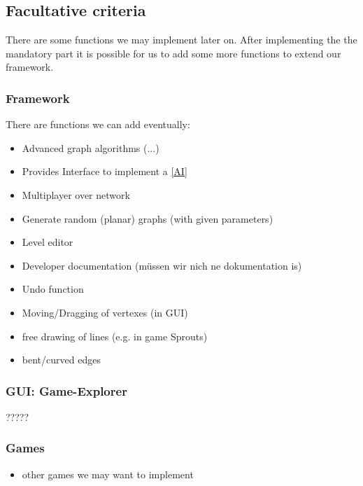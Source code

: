\subsection{Facultative criteria}
There are some functions we may implement later on. After implementing the the mandatory part it is possible for us to add some more functions to extend our framework.

\subsubsection{Framework}
There are functions we can add eventually: 
\begin{itemize}
\item Advanced graph algorithms (...)
\item Provides Interface to implement a \ref{AI}
\item Multiplayer over network
\item Generate random (planar) graphs (with given parameters)
\item Level editor
\item Developer documentation (müssen wir nich ne dokumentation is)
\item Undo function
\item Moving/Dragging of vertexes (in GUI)
\item free drawing of lines (e.g. in game Sprouts)
\item bent/curved edges
\end{itemize}

\subsubsection{GUI: Game-Explorer}
?????

\subsubsection{Games}
\begin{itemize}
\item other games we may want to implement
\end{itemize}